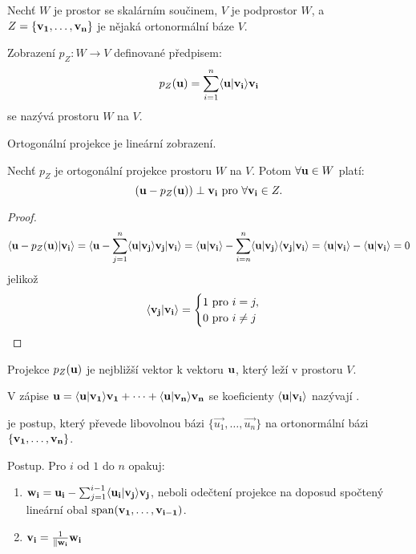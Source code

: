 \begin{definition}
    Nechť $W$ je prostor se skalárním součinem, $V$ je podprostor $W$, a
    $Z = \{\mathbf{v_1}, \dots, \mathbf{v_n}\}$ je nějaká ortonormální báze $V$.

    Zobrazení $p_Z: W \rightarrow V$ definované předpisem:
    $$p_Z(\mathbf{u}) = \sum_{i=1}^n \langle \mathbf{u} | \mathbf{v_i} \rangle\mathbf{v_i}$$
    se nazývá  prostoru $W$ na $V$.
\end{definition}

\begin{observation}
    Ortogonální projekce je lineární zobrazení.
\end{observation}

\begin{lemma}
    \label{lemma:gso}
    Nechť $p_Z$ je ortogonální projekce prostoru $W$ na $V$. Potom 
    $\forall \mathbf{u} \in W$ platí:
    $$(\mathbf{u} - p_Z(\mathbf{u})) \perp \mathbf{v_i} \text{ pro } \forall \mathbf{v_i} \in Z.$$
\end{lemma}

\begin{proof}
    $$\langle \mathbf{u} - p_Z(\mathbf{u}) | \mathbf{v_i} \rangle = \langle \mathbf{u} - \sum_{j=1}^n \langle \mathbf{u} | \mathbf{v_j} \rangle
    \mathbf{v_j} | \mathbf{v_i} \rangle = \langle \mathbf{u} | \mathbf{v_i} \rangle - \sum_{i=n}^n \langle \mathbf{u} | \mathbf{v_j} \rangle
    \langle \mathbf{v_j} | \mathbf{v_i} \rangle = \langle \mathbf{u} | \mathbf{v_i} \rangle - \langle \mathbf{u} | \mathbf{v_i} \rangle = 0$$
    jelikož
    $$\langle \mathbf{v_j} | \mathbf{v_i} \rangle = \begin{cases}
        1 \text{ pro } i=j, \\
        0 \text{ pro } i \neq j
    \end{cases}$$
\end{proof}

\begin{observation}
    Projekce $p_Z(\mathbf{u})$ je nejbližší vektor k vektoru $\mathbf{u}$, který leží v 
    prostoru $V$.
\end{observation}

\begin{definition}
    V zápise $\mathbf{u} = \langle \mathbf{u} | \mathbf{v_1} \rangle\mathbf{v_1} + \dots + \langle \mathbf{u} | \mathbf{v_n} \rangle\mathbf{v_n}$
    se koeficienty $\langle \mathbf{u} | \mathbf{v_i} \rangle$ nazývají 
    .
\end{definition}

\begin{algorithm}
     je postup, který převede 
    libovolnou
    bázi $\{\vec{u_1}, \dots, \vec{u_n}\}$ na ortonormální bázi $\{\mathbf{v_1},
    \dots, \mathbf{v_n}\}$.

    Postup. Pro $i$ od $1$ do $n$ opakuj:
    \begin{enumerate}
        \item $\mathbf{w_i} = \mathbf{u_i} - \sum_{j=1}^{i-1} \langle \mathbf{u_i} | \mathbf{v_j} \rangle\mathbf{v_j}$,
            neboli odečtení projekce na doposud spočtený lineární obal 
            $\mathop{\mathrm{span}}(\mathbf{v_1}, \dots, \mathbf{v_{i-1}})$.
        \item $\mathbf{v_i} = \frac{1}{\|\mathbf{w_i}} \mathbf{w_i}$
    \end{enumerate}
\end{algorithm}


